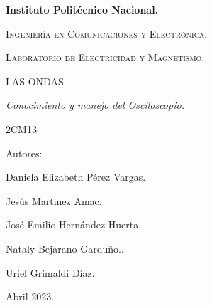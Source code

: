 \documentclass[10pt]{article}
\begin{document}
\pagestyle{fancy}
\cfoot{}


\lhead{}

\begin{titlepage}

	\begin{figure}[t]
		\hspace{0.7\textwidth}
	\end{figure}

	\centering
	{\bfseries\Huge Instituto Politécnico Nacional. \par}
	\vspace{1cm}
	{\scshape\Large Ingeniería en Comunicaciones y Electrónica. \par}
	\vspace{0.3cm}
	{\scshape\Large Laboratorio de Electricidad y Magnetismo.  \par}
	\vspace{1cm}
	{\scshape\Huge LAS ONDAS \par}
	\vspace{1cm}
	{\itshape\Large Conocimiento y manejo del Osciloscopio. \par}
	{\Large 2CM13\par}
	\vfill
	{\Large Autores: \par}
	{\Large Daniela Elizabeth Pérez Vargas. \par}
	{\Large Jesús Martinez Amac. \par}
	{\Large José Emilio Hernández Huerta. \par}
	{\Large Nataly Bejarano Garduño..\par}
	{\Large Uriel Grimaldi Díaz.  \par}
	\vfill
	{\Large Abril 2023. \par}

\end{titlepage}
\end{document}
